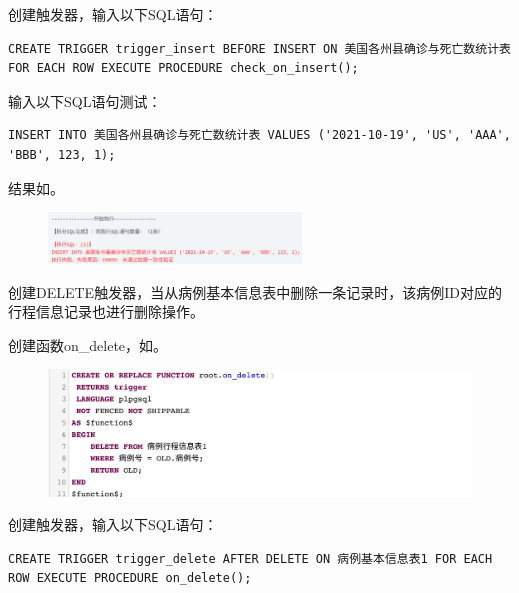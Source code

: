 \documentclass[lang=cn,11pt,a4paper,cite=authornum]{paper}
\begin{document}
创建触发器，输入以下SQL语句：
\begin{code}
\begin{verbatim}
CREATE TRIGGER trigger_insert BEFORE INSERT ON 美国各州县确诊与死亡数统计表 FOR EACH ROW EXECUTE PROCEDURE check_on_insert();
\end{verbatim}
\end{code}

输入以下SQL语句测试：
\begin{code}
\begin{verbatim}
INSERT INTO 美国各州县确诊与死亡数统计表 VALUES ('2021-10-19', 'US', 'AAA', 'BBB', 123, 1);
\end{verbatim}
\end{code}

结果如。
\begin{figure}[!htb]
    \centering
    \includegraphics[width=0.6\textwidth]{./images/res34.png}
    \caption{\label{fig:res34}}
\end{figure}

创建DELETE触发器，当从病例基本信息表中删除一条记录时，该病例ID对应的行程信息记录也进行删除操作。

创建函数on\_delete，如。
\begin{figure}[!htb]
    \centering
    \includegraphics[width=\textwidth]{./images/res35.png}
    \caption{\label{fig:res35}}
\end{figure}

创建触发器，输入以下SQL语句：
\begin{code}
\begin{verbatim}
CREATE TRIGGER trigger_delete AFTER DELETE ON 病例基本信息表1 FOR EACH ROW EXECUTE PROCEDURE on_delete();
\end{verbatim}
\end{code}
\end{document}
